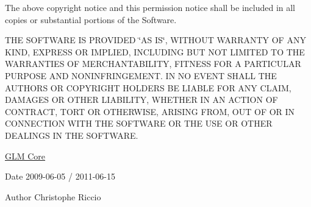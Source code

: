 The above copyright notice and this permission notice shall be included in all copies or substantial portions of the Software.

T\-H\-E S\-O\-F\-T\-W\-A\-R\-E I\-S P\-R\-O\-V\-I\-D\-E\-D \char`\"{}\-A\-S I\-S\char`\"{}, W\-I\-T\-H\-O\-U\-T W\-A\-R\-R\-A\-N\-T\-Y O\-F A\-N\-Y K\-I\-N\-D, E\-X\-P\-R\-E\-S\-S O\-R I\-M\-P\-L\-I\-E\-D, I\-N\-C\-L\-U\-D\-I\-N\-G B\-U\-T N\-O\-T L\-I\-M\-I\-T\-E\-D T\-O T\-H\-E W\-A\-R\-R\-A\-N\-T\-I\-E\-S O\-F M\-E\-R\-C\-H\-A\-N\-T\-A\-B\-I\-L\-I\-T\-Y, F\-I\-T\-N\-E\-S\-S F\-O\-R A P\-A\-R\-T\-I\-C\-U\-L\-A\-R P\-U\-R\-P\-O\-S\-E A\-N\-D N\-O\-N\-I\-N\-F\-R\-I\-N\-G\-E\-M\-E\-N\-T. I\-N N\-O E\-V\-E\-N\-T S\-H\-A\-L\-L T\-H\-E A\-U\-T\-H\-O\-R\-S O\-R C\-O\-P\-Y\-R\-I\-G\-H\-T H\-O\-L\-D\-E\-R\-S B\-E L\-I\-A\-B\-L\-E F\-O\-R A\-N\-Y C\-L\-A\-I\-M, D\-A\-M\-A\-G\-E\-S O\-R O\-T\-H\-E\-R L\-I\-A\-B\-I\-L\-I\-T\-Y, W\-H\-E\-T\-H\-E\-R I\-N A\-N A\-C\-T\-I\-O\-N O\-F C\-O\-N\-T\-R\-A\-C\-T, T\-O\-R\-T O\-R O\-T\-H\-E\-R\-W\-I\-S\-E, A\-R\-I\-S\-I\-N\-G F\-R\-O\-M, O\-U\-T O\-F O\-R I\-N C\-O\-N\-N\-E\-C\-T\-I\-O\-N W\-I\-T\-H T\-H\-E S\-O\-F\-T\-W\-A\-R\-E O\-R T\-H\-E U\-S\-E O\-R O\-T\-H\-E\-R D\-E\-A\-L\-I\-N\-G\-S I\-N T\-H\-E S\-O\-F\-T\-W\-A\-R\-E.

\hyperlink{group__core}{G\-L\-M Core}

\begin{DoxyDate}{Date}
2009-\/06-\/05 / 2011-\/06-\/15 
\end{DoxyDate}
\begin{DoxyAuthor}{Author}
Christophe Riccio 
\end{DoxyAuthor}

